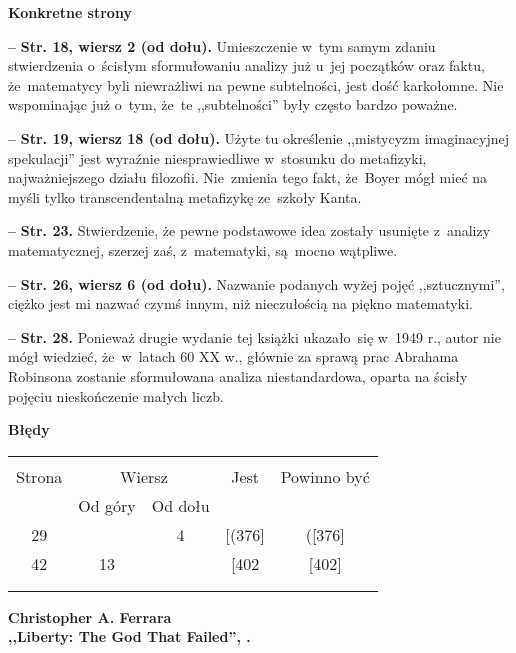\documentclass[a4paper,11pt]{article}
\newcommand{\spaceOne}{2em}
\newcommand{\spaceThree}{0.5em}
\newcommand{\tb}{\textbf}
\newcommand{\noi}{\noindent}
\newcommand{\start}{\noi \tb{--} {}}
\newcommand{\Center}[1]{\begin{center} #1 \end{center}}
\newcommand{\CenterTB}[1]{\Center{\tb{#1}}}
\newcommand{\Str}[1]{\tb{Str. #1.}}
\newcommand{\StrWd}[2]{\tb{Str. #1, wiersz #2 (od dołu).}}
\newcommand{\Work}[1]{ \begin{center} {\large \tb{#1}} \end{center} }
\begin{document}
\tb{Konkretne strony}

\vspace{\spaceThree}

\start \StrWd{18}{2} Umieszczenie w~tym samym zdaniu stwierdzenia
o~ścisłym sformułowaniu analizy już u~jej początków oraz faktu,
że~matematycy byli niewrażliwi na pewne subtelności, jest dość
karkołomne. Nie wspominając już o~tym, że~te ,,subtelności'' były
często bardzo poważne.

\start \StrWd{19}{18} Użyte tu określenie ,,mistycyzm imaginacyjnej
spekulacji'' jest wyraźnie niesprawiedliwe w~stosunku do metafizyki,
najważniejszego działu filozofii. Nie~zmienia tego fakt, że~Boyer mógł
mieć na myśli tylko transcendentalną metafizykę ze~szkoły Kanta.

\start \Str{23} Stwierdzenie, że pewne podstawowe idea zostały
usunięte z~analizy matematycznej, szerzej zaś, z~matematyki, są~mocno
wątpliwe.

\start \StrWd{26}{6} Nazwanie podanych wyżej pojęć ,,sztucznymi'',
ciężko jest mi nazwać czymś innym, niż nieczułością na piękno
matematyki.

\start \Str{28} Ponieważ drugie wydanie tej książki ukazało~się w~1949
r., autor nie mógł wiedzieć, że~w~latach 60 XX w., głównie za sprawą
prac Abrahama Robinsona zostanie sformułowana analiza niestandardowa,
oparta na ścisły pojęciu nieskończenie małych liczb.

\CenterTB{Błędy}
\begin{center}
  \begin{tabular}{|c|c|c|c|c|}
    \hline
    & \multicolumn{2}{c|}{} & & \\
    Strona & \multicolumn{2}{c|}{Wiersz}& Jest & Powinno być \\ \cline{2-3}
    & Od góry & Od dołu &  &  \\ \hline
    29 & & 4 & [(376] & ([376] \\
    42 & 13 & & [402 & [402] \\
    & & & & \\
    & & & & \\ \hline
  \end{tabular}
\end{center}

\vspace{\spaceOne}







\Work{
  Christopher A. Ferrara \\
  ,,Liberty: The God That Failed'', \cite{Fer12}. }
\end{document}
